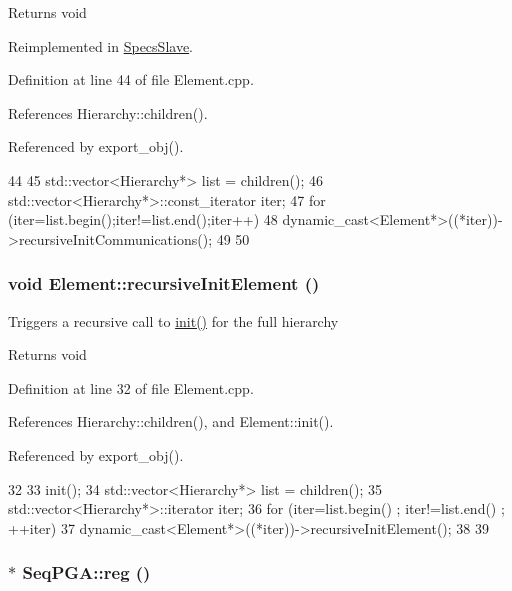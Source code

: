 \begin{DoxyReturn}{Returns}
void 
\end{DoxyReturn}


Reimplemented in \hyperlink{classSpecsSlave_a347b94c2ba660ccde6927fe72590a1bc}{SpecsSlave}.

Definition at line 44 of file Element.cpp.

References Hierarchy::children().

Referenced by export\_\-obj().


\begin{DoxyCode}
44                                          {
45   std::vector<Hierarchy*> list = children();
46   std::vector<Hierarchy*>::const_iterator iter;
47   for (iter=list.begin();iter!=list.end();iter++){
48     dynamic_cast<Element*>((*iter))->recursiveInitCommunications();
49   }
50 }
\end{DoxyCode}
\hypertarget{classElement_a3c0abcb36f8906688bb7e32608df7086}{
\subsubsection[{recursiveInitElement}]{\setlength{\rightskip}{0pt plus 5cm}void Element::recursiveInitElement ()}}
\label{classElement_a3c0abcb36f8906688bb7e32608df7086}
Triggers a recursive call to \hyperlink{classElement_af42754b5cabc198869222725218d695c}{init()} for the full hierarchy

\begin{DoxyReturn}{Returns}
void 
\end{DoxyReturn}


Definition at line 32 of file Element.cpp.

References Hierarchy::children(), and Element::init().

Referenced by export\_\-obj().


\begin{DoxyCode}
32                                   {
33   init();
34   std::vector<Hierarchy*> list = children();
35   std::vector<Hierarchy*>::iterator iter;
36   for (iter=list.begin() ; iter!=list.end() ; ++iter){
37     dynamic_cast<Element*>((*iter))->recursiveInitElement();
38   }
39 }
\end{DoxyCode}
\hypertarget{classSeqPGA_a43c48f29313ca63046cc8efc6cc73e23}{
\subsubsection[{reg}]{$\ast$ SeqPGA::reg ()}}
\label{classSeqPGA_a43c48f29313ca63046cc8efc6cc73e23}


